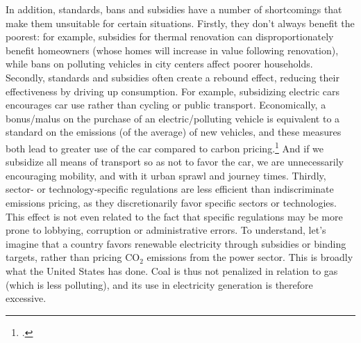 \documentclass[a5paper,english,openany]{memoir}
\begin{document}
In addition, standards, bans and subsidies have a number of shortcomings that make them unsuitable for certain situations. Firstly, they don't always benefit the poorest: for example, subsidies for thermal renovation can disproportionately benefit homeowners (whose homes will increase in value following renovation), while bans on polluting vehicles in city centers affect poorer households. Secondly, standards and subsidies often create a rebound effect, reducing their effectiveness by driving up consumption. For example, subsidizing electric cars encourages car use rather than cycling or public transport. 
Economically, a bonus/malus on the purchase of an electric/polluting vehicle is equivalent to a standard on the emissions (of the average) of new vehicles, and these measures both lead to greater use of the car compared to carbon pricing.\footnote{\citet{fullerton_suggested_2003}.} And if we subsidize all means of transport so as not to favor the car, we are unnecessarily encouraging mobility, and with it urban sprawl and journey times. %
Thirdly, sector- or technology-specific regulations are less efficient than indiscriminate emissions pricing, as they discretionarily favor specific sectors or technologies. This effect is not even related to the fact that specific regulations may be more prone to lobbying, corruption or administrative errors. 
To understand, let's imagine that a country favors renewable electricity through subsidies or binding targets, rather than pricing CO$_\text{2}$ emissions from the power sector. This is broadly what the United States has done. Coal is thus not penalized in relation to gas (which is less polluting), and its use in electricity generation is therefore excessive. %
\end{document}
